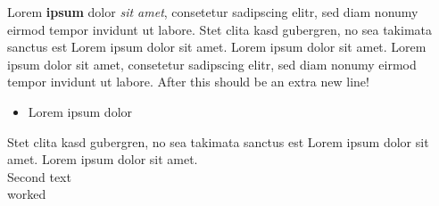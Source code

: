 \documentclass[11pt]{article}
\begin{document}
Lorem \textbf{ipsum} dolor \textit{sit amet}, consetetur sadipscing elitr, sed diam nonumy eirmod tempor invidunt ut labore.
Stet clita kasd gubergren, no sea takimata sanctus est Lorem ipsum dolor sit amet. Lorem ipsum dolor sit amet.
Lorem ipsum dolor sit amet, consetetur sadipscing elitr, sed diam nonumy eirmod tempor invidunt ut labore. After this should be an extra new line!
\begin{itemize}
\item Lorem ipsum dolor
\end{itemize}
Stet clita kasd gubergren, no sea takimata sanctus est Lorem ipsum dolor sit amet. Lorem ipsum dolor sit amet.\\

Second text\\

worked\\
\end{document}
